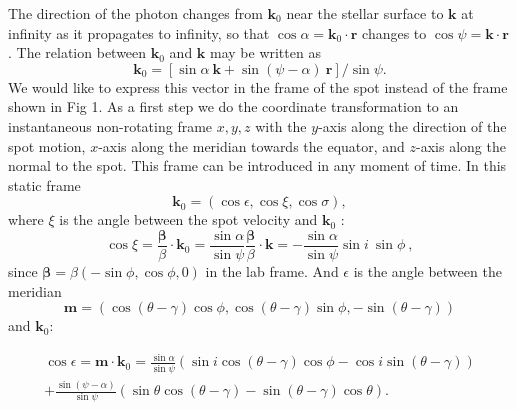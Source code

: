 \documentclass{wihuri}
\def\be{\begin{equation}}
\def\ee{\end{equation}}
\newcommand{\bmath}[1]{\boldsymbol{#1}}
\begin{document}
The direction of the photon changes from $\bmath{k}_0$ near the stellar surface to $\bmath{k}$ at infinity as it propagates to infinity, so that $\cos\alpha=\bmath{k}_0\cdot\bmath{r}$
changes to $\cos\psi=\bmath{k}\cdot\bmath{r}$.
The relation between $\bmath{k}_0$ and $\bmath{k}$ may be written as
\be\label{eq:k02}
\bmath{k}_0=[ \sin\alpha\ \bmath{k} +\sin(\psi-\alpha)\ \bmath{r}]/\sin\psi.
\ee
We would like to express this vector in the frame of the spot instead of the frame shown in Fig 1. As a first step we do the coordinate transformation to an instantaneous non-rotating frame $x,y,z$ with the $y$-axis along the direction of the spot motion, $x$-axis along the meridian towards the equator, and $z$-axis along the normal  to the spot. This frame can be introduced in any moment of time. In this static frame
\be 
\bmath{k}_0=
\left( 
\cos \epsilon,
\cos\xi, 
\cos\sigma
\right) ,
\ee 
where $\xi$ is the angle  between the spot velocity and $\bmath{k}_0$ :   
\be \label{eq:cosxi22}
\cos\xi=\frac{\bmath{\beta}}{\beta} \cdot \bmath{k}_0
=\frac{\sin\alpha}{\sin\psi} \frac{\bmath{\beta}}{\beta} \cdot \bmath{k}=
- \frac{\sin\alpha}{\sin\psi}\sin i\ \sin\phi\ ,
\ee
since $\bmath{\beta} = \beta(-\sin\phi,\cos\phi,0)$ in the lab frame. And $\epsilon$ is the angle between the meridian 
\be
 \bmath{m} = (\cos(\theta - \gamma)\cos \phi ,\cos (\theta -\gamma)\sin \phi, -\sin (\theta -\gamma))
\ee
and $\bmath{k}_0$: 

\be \label{eq:kx-comp}
\begin{split}
\cos\epsilon= \bmath{m} \cdot \bmath{k}_0
=\frac{\sin\alpha}{\sin\psi} (\sin i \cos(\theta -\gamma)\cos \phi -\cos i \sin (\theta -\gamma)) \\ + \frac{\sin (\psi - \alpha)}{\sin \psi}(\sin \theta \cos (\theta -\gamma)-\sin (\theta -\gamma)\cos \theta).
\end{split}
\ee

\end{document}
